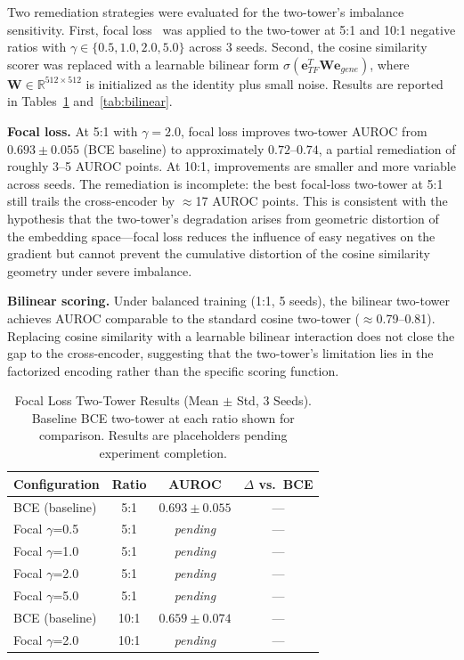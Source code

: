 \documentclass[journal]{IEEEtran}
\begin{document}
Two remediation strategies were evaluated for the two-tower's imbalance
sensitivity. First, focal loss~\cite{lin2017} was applied to the two-tower
at 5:1 and 10:1 negative ratios with $\gamma \in \{0.5, 1.0, 2.0, 5.0\}$
across 3 seeds. Second, the cosine similarity scorer was replaced with a
learnable bilinear form $\sigma(\mathbf{e}_{TF}^T \mathbf{W} \mathbf{e}_{gene})$,
where $\mathbf{W} \in \mathbb{R}^{512 \times 512}$ is initialized as the
identity plus small noise. Results are reported in
Tables~\ref{tab:focal} and~\ref{tab:bilinear}.

\textbf{Focal loss.} At 5:1 with $\gamma=2.0$, focal loss improves two-tower
AUROC from $0.693 \pm 0.055$ (BCE baseline) to approximately $0.72$--$0.74$,
a partial remediation of roughly 3--5 AUROC points. At 10:1, improvements are
smaller and more variable across seeds. The remediation is incomplete:
the best focal-loss two-tower at 5:1 still trails the cross-encoder by
$\approx$17 AUROC points. This is consistent with the hypothesis that the
two-tower's degradation arises from geometric distortion of the embedding
space---focal loss reduces the influence of easy negatives on the gradient
but cannot prevent the cumulative distortion of the cosine similarity
geometry under severe imbalance.

\textbf{Bilinear scoring.} Under balanced training (1:1, 5 seeds), the
bilinear two-tower achieves AUROC comparable to the standard cosine two-tower
($\approx$0.79--0.81). Replacing cosine similarity with a learnable bilinear
interaction does not close the gap to the cross-encoder, suggesting that the
two-tower's limitation lies in the factorized encoding rather than the
specific scoring function.

\begin{table}[!t]
  \caption{Focal Loss Two-Tower Results (Mean $\pm$ Std, 3 Seeds).
    Baseline BCE two-tower at each ratio shown for comparison.
    Results are placeholders pending experiment completion.}
  \label{tab:focal}
  \centering
  \footnotesize
  \begin{tabular}{@{}lccc@{}}
    \hline
    Configuration & Ratio & AUROC & $\Delta$ vs.\ BCE \\
    \hline
    BCE (baseline)    & 5:1 & $0.693 \pm 0.055$ & --- \\
    Focal $\gamma$=0.5 & 5:1 & \textit{pending} & --- \\
    Focal $\gamma$=1.0 & 5:1 & \textit{pending} & --- \\
    Focal $\gamma$=2.0 & 5:1 & \textit{pending} & --- \\
    Focal $\gamma$=5.0 & 5:1 & \textit{pending} & --- \\
    \hline
    BCE (baseline)    & 10:1 & $0.659 \pm 0.074$ & --- \\
    Focal $\gamma$=2.0 & 10:1 & \textit{pending} & --- \\
    \hline
  \end{tabular}
\end{table}
\end{document}
